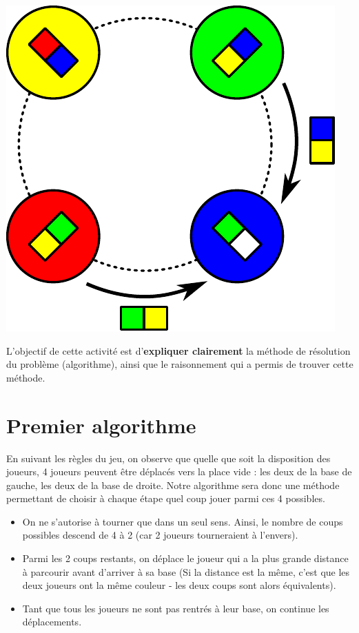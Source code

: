 \documentclass[a5paper,pagesize,DIV=14]{scrbook}
\begin{document}
\begin{center}
  \includegraphics[width=0.3\linewidth]{img/baseball_coup.pdf}
\end{center}


L'objectif de cette activité est d'\textbf{expliquer clairement} la méthode de résolution du problème (algorithme), ainsi que le raisonnement qui a permis de trouver cette méthode.

\newpage

\section*{Premier algorithme}

En suivant les règles du jeu, on observe que quelle que soit la disposition des joueurs, 4 joueurs peuvent être déplacés vers la place vide : les deux de la base de gauche, les deux de la base de droite. Notre algorithme sera donc une méthode permettant de choisir à chaque étape quel coup jouer parmi ces 4 possibles.

\begin{itemize}
  \item On ne s'autorise à tourner que dans un seul sens. Ainsi, le nombre de coups possibles descend de 4 à 2 (car 2 joueurs tourneraient à l'envers).
  \item Parmi les 2 coups restants, on déplace le joueur qui a la plus grande distance à parcourir avant d'arriver à sa base (Si la distance est la même, c'est que les deux joueurs ont la même couleur - les deux coups sont alors équivalents).
  \item Tant que tous les joueurs ne sont pas rentrés à leur base, on continue les déplacements.
\end{itemize}
\end{document}
